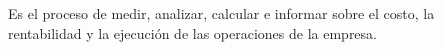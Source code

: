 Es el proceso de medir, analizar, calcular e informar sobre el costo, la rentabilidad y la ejecución  de las operaciones de la empresa.
